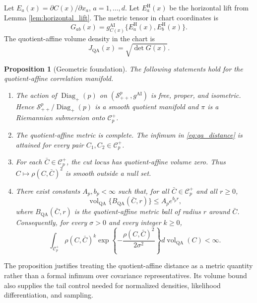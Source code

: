 \documentclass[
  12pt]{article}
\newcommand{\SPD}{\mathcal S_{++}}
\newcommand{\Corr}{\mathcal C^+}
\newcommand{\Diagp}{\operatorname{Diag}_{+}}
\newcommand{\vol}{\operatorname{vol}}
\newcommand{\QA}{\mathrm{QA}}
\newcommand{\AI}{\mathrm{AI}}
\newtheorem{proposition}{Proposition}
\begin{document}
Let $E_a(x)=\partial C(x)/\partial x_a$, $a=1,\ldots,d$. Let $E_a^{\mathrm H}(x)$ be the horizontal lift from Lemma \ref{lem:horizontal_lift}. The metric tensor in chart coordinates is
\begin{equation}\label{eq:metric_tensor_chart}
G_{ab}(x)=g^{\AI}_{C(x)}\{E_a^{\mathrm H}(x),E_b^{\mathrm H}(x)\}.
\end{equation}
The quotient-affine volume density in the chart is
\begin{equation}\label{eq:volume_density}
J_{\QA}(x)=\sqrt{\det G(x)}.
\end{equation}

\begin{proposition}[Geometric foundation]\label{prop:geometric_foundation}
The following statements hold for the quotient-affine correlation manifold.
\begin{enumerate}[label=(\alph*)]
\item The action of $\Diagp(p)$ on $(\SPD^p,g^{\AI})$ is free, proper, and isometric. Hence $\SPD^p/\Diagp(p)$ is a smooth quotient manifold and $\pi$ is a Riemannian submersion onto $\Corr_p$.
\item The quotient-affine metric is complete. The infimum in \eqref{eq:qa_distance} is attained for every pair $C_1,C_2\in\Corr_p$.
\item For each $\bar C\in\Corr_p$, the cut locus has quotient-affine volume zero. Thus $C\mapsto\rho(C,\bar C)^2$ is smooth outside a null set.
\item There exist constants $A_p,b_p<\infty$ such that, for all $\bar C\in\Corr_p$ and all $r\ge0$,
\begin{equation}\label{eq:volume_growth}
\vol_{\QA}\{B_{\QA}(\bar C,r)\}\le A_p e^{b_p r},
\end{equation}
where $B_{\QA}(\bar C,r)$ is the quotient-affine metric ball of radius $r$ around $\bar C$. Consequently, for every $\sigma>0$ and every integer $k\ge0$,
\[
\int_{\Corr_p}\rho(C,\bar C)^k\exp\left\{-\frac{\rho(C,\bar C)^2}{2\sigma^2}\right\}d\vol_{\QA}(C)<\infty.
\]
\end{enumerate}
\end{proposition}

The proposition justifies treating the quotient-affine distance as a metric quantity rather than a formal infimum over covariance representatives. Its volume bound also supplies the tail control needed for normalized densities, likelihood differentiation, and sampling.

\end{document}
